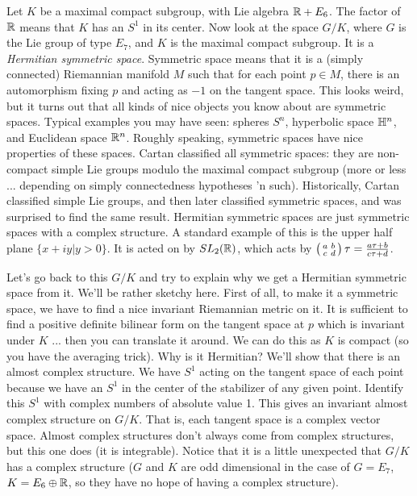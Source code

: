  Let $K$ be a maximal compact subgroup, with Lie algebra $\mathbb{R} + E_6$. The factor of
 $\mathbb{R}$ means that $K$ has an $S^1$ in its center. Now look at the space $G/K$, where
 $G$ is the Lie group of type $E_7$, and $K$ is the maximal compact subgroup. It is a
 \emph{Hermitian symmetric space}. Symmetric space means
 that it is a (simply connected) Riemannian manifold $M$ such that for each point
 $p\in M$, there is an automorphism fixing $p$ and acting as $-1$ on the tangent
 space. This looks weird, but it turns out that all kinds of nice objects you know
 about are symmetric spaces. Typical examples you may have seen: spheres $S^n$,
 hyperbolic space $\mathbb{H}^n$, and Euclidean space $\mathbb{R}^n$. Roughly speaking, symmetric
 spaces have nice properties of these spaces. Cartan classified all
 symmetric spaces: they are non-compact simple Lie groups modulo the maximal compact
 subgroup (more or less ... depending on simply connectedness hypotheses 'n such).
 Historically, Cartan classified simple Lie groups, and then later classified
 symmetric spaces, and was surprised to find the same result. Hermitian symmetric
 spaces are just symmetric spaces with a complex structure. A standard example of this
 is the upper half plane $\{x+iy|y>0\}$. It is acted on by $SL_2(\mathbb{R})$, which acts by
 $\left( \begin{smallmatrix} a & b \\ c & d \end{smallmatrix} \right) \tau = \frac{a\tau + b}{c\tau + d}$.

 Let's go back to this $G/K$ and try to explain why we get a Hermitian symmetric space
 from it. We'll be rather sketchy here. First of all, to make it a symmetric space, we
 have to find a nice invariant Riemannian metric on it. It is sufficient to find a
 positive definite bilinear form on the tangent space at $p$ which is invariant under
 $K$ ... then you can translate it around. We can do this as $K$ is compact (so you
 have the averaging trick). Why is it Hermitian? We'll show that there is an almost
 complex structure. We have $S^1$ acting on the tangent space of each point because we
 have an $S^1$ in the center of the stabilizer of any given point. Identify this $S^1$
 with complex numbers of absolute value 1. This gives an invariant almost complex
 structure on $G/K$. That is, each tangent space is a complex vector space. Almost
 complex structures don't always come from complex structures, but this one does (it
 is integrable). Notice that it is a little unexpected that $G/K$ has a complex
 structure ($G$ and $K$ are odd dimensional in the case of $G=E_7$, $K=E_6\oplus \mathbb{R}$,
 so they have no hope of having a complex structure).

